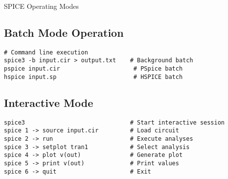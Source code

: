 \documentclass{beamer}
\begin{document}
\begin{frame}{SPICE Operating Modes}
    \subsection{Batch Mode Operation}
    \begin{lstlisting}
# Command line execution
spice3 -b input.cir > output.txt    # Background batch
pspice input.cir                     # PSpice batch
hspice input.sp                      # HSPICE batch
    \end{lstlisting}
    
    \subsection{Interactive Mode}
    \begin{lstlisting}
spice3                              # Start interactive session
spice 1 -> source input.cir         # Load circuit
spice 2 -> run                      # Execute analyses
spice 3 -> setplot tran1            # Select analysis
spice 4 -> plot v(out)              # Generate plot
spice 5 -> print v(out)             # Print values
spice 6 -> quit                     # Exit
    \end{lstlisting}
\end{frame}
\end{document}
